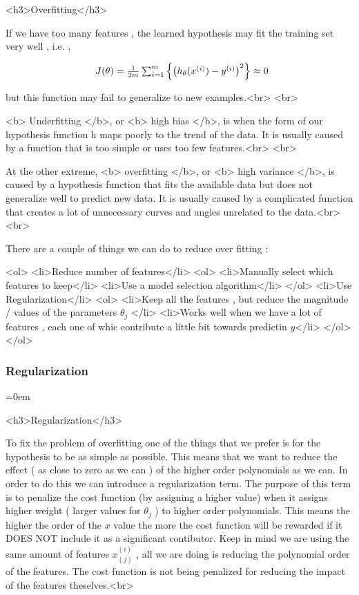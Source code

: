	<h3>Overfitting</h3>

	If we have too many features , the learned hypothesis may fit the training
	set very well , i.e. , 

	\[
		\begin{array}{ l@{} l@{} }


			J(\theta)
			= \frac{1}{2m}
			\sum_{i=1}^m
			\left\{
				\left(
					h_\theta(x^{(i)}) - y^{(i)}
				\right)^{2}
			\right\}

			\approx 0


		\end{array}
	\]

	but this function may fail to generalize to new examples.<br> <br>

	<b> Underfitting </b>, or <b> high bias </b>, is when the form of our
	hypothesis function h maps poorly to the trend of the data. It is usually
	caused by a function that is too simple or uses too few features.<br> <br>

	At the other extreme, <b> overfitting </b>, or <b> high variance </b>, is
	caused by a hypothesis function that fits the available data but does not
	generalize well to predict new data. It is usually caused by a complicated
	function that creates a lot of unnecessary curves and angles unrelated to
	the data.<br> <br>

	There are a couple of things we can do to reduce over fitting :


	<ol>
		<li>Reduce number of features</li>
		<ol>
			<li>Manually select which features to keep</li>
			<li>Use a model selection algorithm</li>
		</ol>
		<li>Use Regularization</li>
		<ol>
			<li>Keep all the features , but reduce the magnitude / values of the
				parameters $\theta_j$ </li>
			<li>Works well when we have a lot of features , each one of whic
				contribute a little bit towards predictin $y$</li>
		</ol>
	</ol>


\subsubsectionend
\subsubsection{Regularization}
\label{sssec:regularization}
\parindent=0em

<h3>Regularization</h3>

To fix the problem of overfitting one of the things that we prefer is for the
hypothesis to be as simple as possible. This means that we want to reduce the
effect ( as close to zero as we can ) of the higher order polynomials as we can.
In order to do this we can introduce a regularization term. The purpose of this
term is to penalize the cost function (by assigning a higher value) when it
assigns higher weight ( larger values for $\theta_j$ ) to higher order
polynomials. This means the higher the order of the $x$ value the more the cost
function will be rewarded if it DOES NOT include it as a significant contibutor.
Keep in mind we are using the same amount of features $x_(j)^{(i)}$ , all we are
doing is reducing the polynomial order of the features. The cost function is not
being penalized for reducing the impact of the features theselves.<br>

